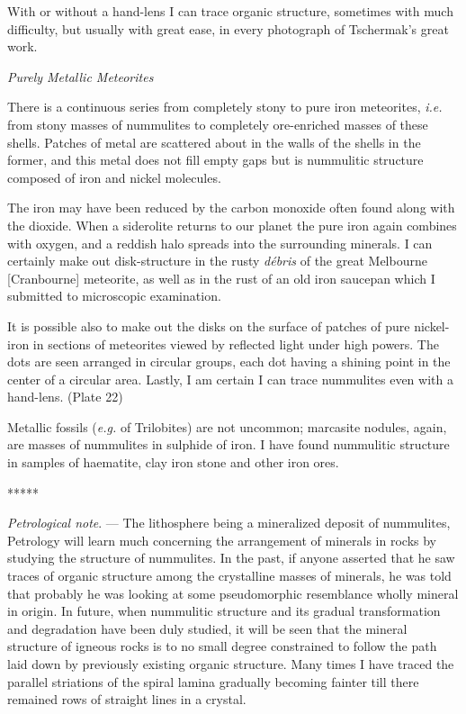 \documentclass[a4paper, 12pt, oneside]{article}
\begin{document}
With or without a hand-lens I can trace organic structure, sometimes with much difficulty, but usually with great ease, in every photograph of Tschermak's great work.

\bigskip
\centerline{\emph{Purely Metallic Meteorites}}

There is a continuous series from completely stony to pure iron meteorites, \emph{i.e.} from stony masses of nummulites to completely ore-enriched masses of these shells. Patches of metal are scattered about in the walls of the shells in the former, and this metal does not fill empty gaps but is nummulitic structure composed of iron and nickel molecules.

The iron may have been reduced by the carbon monoxide often found along with the dioxide. When a siderolite returns to our planet the pure iron again combines with oxygen, and a reddish halo spreads into the surrounding minerals. I can certainly make out disk-structure in the rusty \emph{débris} of the great Melbourne [Cranbourne] meteorite, as well as in the rust of an old iron saucepan which I submitted to microscopic examination.

It is possible also to make out the disks on the surface of patches of pure nickel-iron in sections of meteorites viewed by reflected light under high powers. The dots are seen arranged in circular groups, each dot having a shining point in the center of a circular area. Lastly, I am certain I can trace nummulites even with a hand-lens. (Plate 22)

Metallic fossils (\emph{e.g.} of Trilobites) are not uncommon; marcasite nodules, again, are masses of nummulites in sulphide of iron. I have found nummulitic structure in samples of haematite, clay iron stone and other iron ores.

\centerline{*\hspace{15mm}*\hspace{15mm}*\hspace{15mm}*\hspace{15mm}*}
\bigskip

\emph{Petrological note}. --- The lithosphere being a mineralized deposit of nummulites, Petrology will learn much concerning the arrangement of minerals in rocks by studying the structure of nummulites. In the past, if anyone asserted that he saw traces of organic structure among the crystalline masses of minerals, he was told that probably he was looking at some pseudomorphic resemblance wholly mineral in origin. In future, when nummulitic structure and its gradual transformation and degradation have been duly studied, it will be seen that the mineral structure of igneous rocks is to no small degree constrained to follow the path laid down by previously existing organic structure. Many times I have traced the parallel striations of the spiral lamina gradually becoming fainter till there remained rows of straight lines in a crystal.
\end{document}
